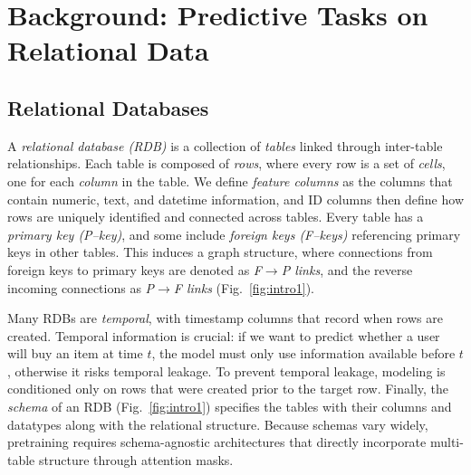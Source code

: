 \section{Background: Predictive Tasks on Relational Data}
\label{sec:background}

\subsection{Relational Databases}
A \textit{relational database (RDB)} is a collection of \textit{tables} linked through inter-table relationships. Each table is composed of \textit{rows}, where every row is a set of \textit{cells}, one for each \textit{column} in the table.
We define \textit{feature columns} as the columns that contain numeric, text, and datetime information, and ID columns then define how rows are uniquely identified and connected across tables.
Every table has a \textit{primary key (P--key)}, and some include \textit{foreign keys (F--keys)} referencing primary keys in other tables.
This induces a graph structure, where connections from foreign keys to primary keys are denoted as
\textit{F$\to$P links}, and the reverse incoming connections as \textit{P$\to$F links} (Fig.~\ref{fig:intro1}).


Many RDBs are \textit{temporal}, with timestamp columns that record when rows are created. Temporal information is crucial: if we want to predict whether a user will buy an item at time $t$, the model must only use information available before 
$t$, otherwise it risks temporal leakage. To prevent temporal leakage, modeling is conditioned only on rows that were created prior to the target row. Finally, the \textit{schema} of an RDB (Fig.~\ref{fig:intro1}) specifies the tables with their columns and datatypes along with the relational structure. Because schemas vary widely, pretraining requires schema-agnostic architectures that directly incorporate multi-table structure through attention masks.


